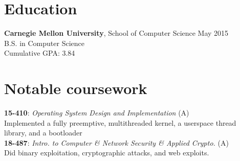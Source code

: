 \documentclass[margin]{res}
\newcommand{\course}[4]{ %
    \textbf{#1}: \textit{#2} (#4)\\
      #3
      \vspace{1em}
    \\}
\begin{document}

\address{
  5032 Forbes Avenue SMC 6899 \\
  Pittsburgh, PA 15289-6899 \\
  (302) 468-7537
}
\address{  %
  \hfill \href{mailto:joshz@joshz.org}{joshz@joshz.org} \\
  \hfill
    \href{https://github.com/joshzimmerman}{https://github.com/joshzimmerman} \\
  \hfill \href{http://joshz.org}{http://joshz.org}
}

\begin{resume}

\section{Education}
  \textbf{Carnegie Mellon University}, School of Computer Science
    \hfill May 2015\\
  B.S. in Computer Science\\
  Cumulative GPA: 3.84

\section{Notable coursework}
 \course{15-410}{Operating System Design and Implementation}
 {Implemented a fully preemptive, multithreaded kernel, a userspace thread \\library, and a bootloader}{A}
  \course{18-487}{Intro. to Computer \& Network Security \& Applied Crypto.}
 {Did binary exploitation, cryptographic attacks, and web exploits.}{A}
      \vspace{-2em}


\end{resume}
\end{document}
